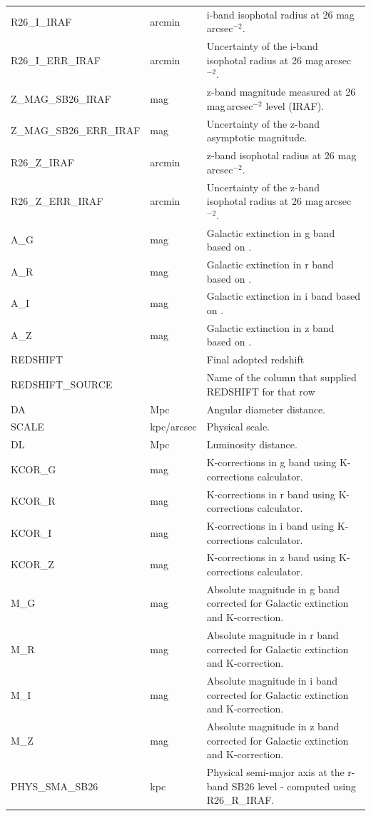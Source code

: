\documentclass{aa}
\begin{document}
\begin{appendix}
\begin{table}[htbp]
\begin{tabular}{lll}
R26\_I\_IRAF & arcmin & i-band isophotal radius at 26 mag\,arcsec$^{-2}$. \\
R26\_I\_ERR\_IRAF & arcmin & Uncertainty of the i-band isophotal radius at 26 mag\,arcsec$^{-2}$. \\
Z\_MAG\_SB26\_IRAF & mag & z-band magnitude measured at 26 mag\,arcsec$^{-2}$ level (IRAF). \\
Z\_MAG\_SB26\_ERR\_IRAF & mag & Uncertainty of the z-band asymptotic magnitude. \\
R26\_Z\_IRAF & arcmin & z-band isophotal radius at 26 mag\,arcsec$^{-2}$. \\
R26\_Z\_ERR\_IRAF & arcmin & Uncertainty of the z-band isophotal radius at 26 mag\,arcsec$^{-2}$. \\
A\_G & mag & Galactic extinction in g band based on \citet{2011ApJ...737..103S}. \\
A\_R & mag & Galactic extinction in r band based on \citet{2011ApJ...737..103S}. \\
A\_I & mag & Galactic extinction in i band based on \citet{2011ApJ...737..103S}. \\
A\_Z & mag & Galactic extinction in z band based on \citet{2011ApJ...737..103S}. \\
REDSHIFT &  & Final adopted redshift \\
REDSHIFT\_SOURCE &  & Name of the column that supplied REDSHIFT for that row \\
DA & Mpc & Angular diameter distance. \\
SCALE & kpc/arcsec & Physical scale. \\
DL & Mpc & Luminosity distance. \\
KCOR\_G & mag & K-corrections in g band using K-corrections calculator. \\
KCOR\_R & mag & K-corrections in r band using K-corrections calculator. \\
KCOR\_I & mag & K-corrections in i band using K-corrections calculator. \\
KCOR\_Z & mag & K-corrections in z band using K-corrections calculator. \\
M\_G & mag & Absolute magnitude in g band corrected for Galactic extinction and K-correction. \\
M\_R & mag & Absolute magnitude in r band corrected for Galactic extinction and K-correction. \\
M\_I & mag & Absolute magnitude in i band corrected for Galactic extinction and K-correction. \\
M\_Z & mag & Absolute magnitude in z band corrected for Galactic extinction and K-correction. \\
PHYS\_SMA\_SB26 & kpc & Physical semi-major axis at the r-band SB26 level - computed using R26\_R\_IRAF. \\
\hline
\end{tabular}
\end{table}

\end{appendix}

\label{LastPage}
\end{document}
